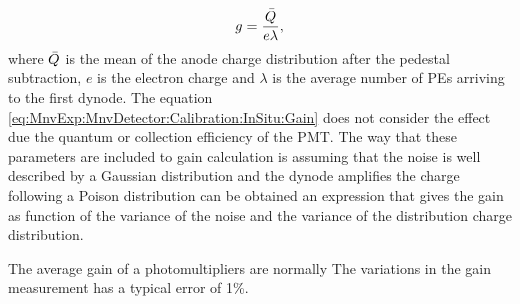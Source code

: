 \begin{itemize}
    \begin{equation}
        g=\frac{\Bar{Q}}{e\lambda},
        \label{eq:MnvExp:MnvDetector:Calibration:InSitu:Gain}
    \end{equation}
    where $\Bar{Q}$ is the mean of the anode charge distribution after the pedestal subtraction, $e$ is the electron charge and $\lambda$ is the average number of PEs arriving to the first dynode. The equation \ref{eq:MnvExp:MnvDetector:Calibration:InSitu:Gain} does not consider the effect due the quantum or collection efficiency of the PMT. The way that these parameters are included to gain calculation is assuming that the noise is well described by a Gaussian distribution and the dynode amplifies the charge following a Poison distribution can be obtained an expression that gives the gain as function of the variance of the noise and the variance of the distribution charge distribution.
    
    The average gain of a photomultipliers are normally  The variations in the gain measurement has a typical error of 1\%. 
    

\end{itemize}
